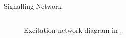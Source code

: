 \documentclass[12pt]{beamer}
\begin{document}
\begin{frame}{Signalling Network}
\begin{columns}
\begin{column}{0.6\textwidth}
	\begin{figure}
		\caption{\small Excitation network diagram in \cite{Iglesias2013}.} 
	\end{figure}
\end{column}
\begin{column}{0.4\textwidth}
	\begin{figure}

\end{figure}
\end{column}
\end{columns}
\end{frame}
\end{document}
